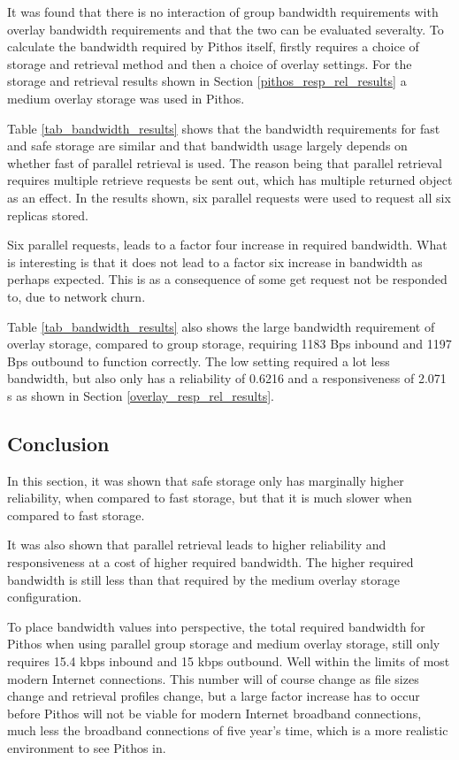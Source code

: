 It was found that there is no interaction of group bandwidth requirements with overlay bandwidth requirements and that the two can be evaluated severalty. To calculate the bandwidth required by Pithos itself, firstly requires a choice of storage and retrieval method and then a choice of overlay settings. For the storage and retrieval results shown in Section \ref{pithos_resp_rel_results} a medium overlay storage was used in Pithos.

Table \ref{tab_bandwidth_results} shows that the bandwidth requirements for fast and safe storage are similar and that bandwidth usage largely depends on whether fast of parallel retrieval is used. The reason being that parallel retrieval requires multiple retrieve requests be sent out, which has multiple returned object as an effect. In the results shown, six parallel requests were used to request all six replicas stored.

Six parallel requests, leads to a factor four increase in required bandwidth. What is interesting is that it does not lead to a factor six increase in bandwidth as perhaps expected. This is as a consequence of some get request not be responded to, due to network churn.

Table \ref{tab_bandwidth_results} also shows the large bandwidth requirement of overlay storage, compared to group storage, requiring 1183 Bps inbound and 1197 Bps outbound to function correctly. The low setting required a lot less bandwidth, but also only has a reliability of 0.6216 and a responsiveness of 2.071 s as shown in Section \ref{overlay_resp_rel_results}.

\subsection{Conclusion}

In this section, it was shown that safe storage only has marginally higher reliability, when compared to fast storage, but that it is much slower when compared to fast storage.

It was also shown that parallel retrieval leads to higher reliability and responsiveness at a cost of higher required bandwidth. The higher required bandwidth is still less than that required by the medium overlay storage configuration.

To place bandwidth values into perspective, the total required bandwidth for Pithos when using parallel group storage and medium overlay storage, still only requires 15.4 kbps inbound and 15 kbps outbound. Well within the limits of most modern Internet connections. This number will of course change as file sizes change and retrieval profiles change, but a large factor increase has to occur before Pithos will not be viable for modern Internet broadband connections, much less the broadband connections of five year's time, which is a more realistic environment to see Pithos in.

